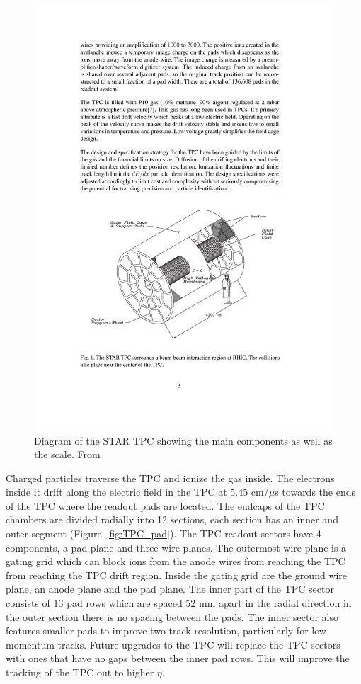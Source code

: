 \begin{figure}[htbp]
\begin{center}
\includegraphics[scale=1.0]{Plots/Detector/TPC.pdf}
\end{center}
\caption[TPC Diagram]{Diagram of the STAR TPC showing the main components as well as the scale. From~\cite{tpcNIM}}
\label{fig:TPC}
\end{figure}

Charged particles traverse the TPC and ionize the gas inside. The electrons inside it drift along the electric field in the TPC at 5.45 cm/$\mu$s towards the ends of the TPC where the readout pads are located. The endcaps of the TPC chambers are divided radially into 12 sections, each section has an inner and outer segment (Figure~\ref{fig:TPC_pad}). The TPC readout sectors have 4 components, a pad plane and three wire planes. The outermost wire plane is a gating grid which can block ions from the anode wires from reaching the TPC from reaching the TPC drift region. Inside the gating grid are the ground wire plane, an anode plane and the pad plane. The inner part of the TPC sector consists of 13 pad rows which are spaced 52 mm apart in the radial direction in the outer section there is no spacing between the pads. The inner sector also features smaller pads to improve two track resolution, particularly for low momentum tracks. Future upgrades to the TPC will replace the TPC sectors with ones that have no gaps between the inner pad rows. This will improve the tracking of the TPC out to higher $\eta$. 

